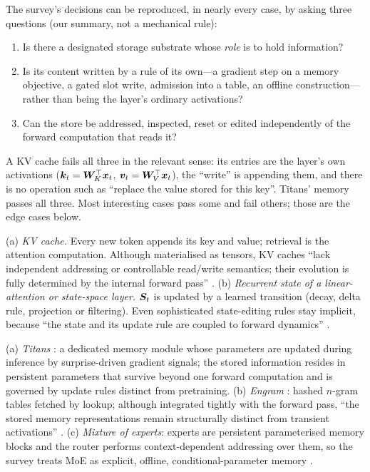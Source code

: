 The survey's decisions can be reproduced, in nearly every case, by asking three questions (our
summary, not a mechanical rule):
\begin{enumerate}[label=(Q\arabic*)]
  \item Is there a designated storage substrate whose \emph{role} is to hold information?
  \item Is its content written by a rule of its own---a gradient step on a memory objective, a
        gated slot write, admission into a table, an offline construction---rather than being
        the layer's ordinary activations?
  \item Can the store be addressed, inspected, reset or edited independently of the forward
        computation that reads it?
\end{enumerate}
A KV cache fails all three in the relevant sense: its entries are the layer's own activations
($\bm{k}_t = \bm{W}_K^{\top}\bm{x}_t$, $\bm{v}_t = \bm{W}_V^{\top}\bm{x}_t$), the ``write'' is appending them, and there is no
operation such as ``replace the value stored for this key''. Titans' memory passes all three. Most
interesting cases pass some and fail others; those are the edge cases below.

\begin{example}\label{ex:c02-implicit}
(a) \emph{KV cache.} Every new token appends its key and value; retrieval is the attention
computation. Although materialised as tensors, KV caches ``lack independent addressing or
controllable read/write semantics; their evolution is fully determined by the internal forward
pass'' \citep[\S III-A]{zhoubian2026memory}. (b) \emph{Recurrent state of a linear-attention or
state-space layer.} $\bm{S}_t$ is updated by a learned transition (decay, delta rule, projection or
filtering). Even sophisticated state-editing rules stay implicit, because ``the state and its
update rule are coupled to forward dynamics'' \citep[\S III-C]{zhoubian2026memory}.
\end{example}

\begin{example}\label{ex:c02-explicit}
(a) \emph{Titans} \citep{behrouz2025titans}: a dedicated memory module whose parameters are
updated during inference by surprise-driven gradient signals; the stored information resides in
persistent parameters that survive beyond one forward computation and is governed by update rules
distinct from pretraining. (b) \emph{Engram} \citep{cheng2026engram}: hashed $n$-gram tables
fetched by lookup; although integrated tightly with the forward pass, ``the stored memory
representations remain structurally distinct from transient activations''
\citep[\S IV-B]{zhoubian2026memory}. (c) \emph{Mixture of experts}: experts are persistent
parameterised memory blocks and the router performs context-dependent addressing over them, so the
survey treats MoE as explicit, offline, conditional-parameter memory \citep[\S IV-C]{zhoubian2026memory}.
\end{example}

